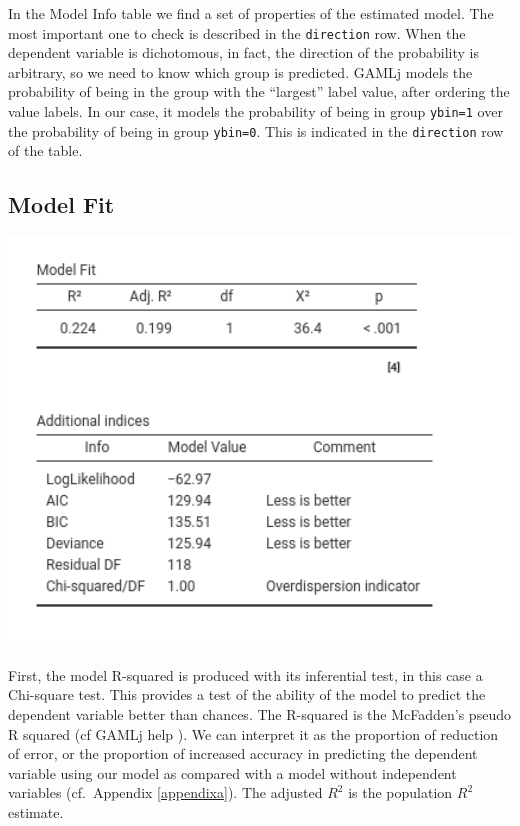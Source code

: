 \documentclass[
]{book}
\begin{document}
In the {Model Info} table we find a set of properties of the estimated model. The most important one to check is described in the \texttt{direction} row. When the dependent variable is dichotomous, in fact, the direction of the probability is arbitrary, so we need to know which group is predicted. {GAMLj} models the probability of being in the group with the ``largest'' label value, after ordering the value labels. In our case, it models the probability of being in group \texttt{ybin=1} over the probability of being in group \texttt{ybin=0}. This is indicated in the \texttt{direction} row of the table.

\hypertarget{model-fit}{%
\subsection{Model Fit}\label{model-fit}}

\includegraphics[width=5.89in]{bookletpics/3_logistic_output2}

First, the model R-squared is produced with its inferential test, in this case a Chi-square test. This provides a test of the ability of the model to predict the dependent variable better than chances. The R-squared is the McFadden's pseudo R squared (cf GAMLj help
). We can interpret it as the proportion of reduction of error, or the proportion of increased accuracy in predicting the dependent variable using our model as compared with a model without independent variables (cf.~Appendix \ref{appendixa}). The adjusted \(R^2\) is the population \(R^2\) estimate.
\end{document}
